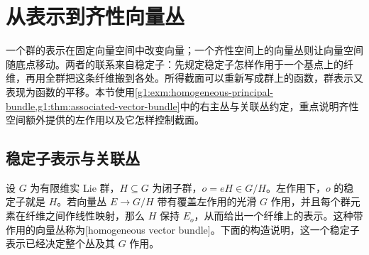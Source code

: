 
% 
% 

\section{从表示到齐性向量丛}
\label{g1:sec:2003}

一个群的表示在固定向量空间中改变向量；一个齐性空间上的向量丛则让向量空间随底点移动。两者的联系来自稳定子：先规定稳定子怎样作用于一个基点上的纤维，再用全群把这条纤维搬到各处。所得截面可以重新写成群上的函数，群表示又表现为函数的平移。本节使用\cref{g1:exm:homogeneous-principal-bundle,g1:thm:associated-vector-bundle}中的右主丛与关联丛约定，重点说明齐性空间额外提供的左作用以及它怎样控制截面。

\subsection{稳定子表示与关联丛}
\label{g1:subsec:2003:01}
设 \(G\) 为有限维实 Lie 群，\(H\subseteq G\) 为闭子群，\(o=eH\in G/H\)。左作用下，\(o\) 的稳定子就是 \(H\)。若向量丛 \(E\to G/H\) 带有覆盖左作用的光滑 \(G\) 作用，并且每个群元素在纤维之间作线性映射，那么 \(H\) 保持 \(E_o\)，从而给出一个纤维上的表示。这种带作用的向量丛称为[homogeneous vector bundle]。下面的构造说明，这一个稳定子表示已经决定整个丛及其 \(G\) 作用。

